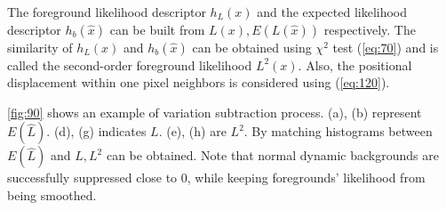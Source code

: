 \documentclass[conference]{IEEEtran}
\begin{document}
The foreground likelihood descriptor \begin{math} h_L(x) \end{math} and the expected likelihood descriptor \begin{math} h_b(\hat{x}) \end{math} can be built from \begin{math} L(x), E(L(\hat{x})) \end{math} respectively. The similarity of \begin{math} h_L(x) \end{math}  and \begin{math} h_b(\hat{x}) \end{math} can be obtained using \begin{math} \chi ^2 \end{math} test (\ref{eq:70}) and is called the second-order foreground likelihood \begin{math} L^2(x) \end{math}. Also, the positional displacement within one pixel neighbors is considered using (\ref{eq:120}).

\ref{fig:90} shows an example of variation subtraction process. (a), (b) represent \begin{math} E(\hat{L}) \end{math}. (d), (g) indicates \begin{math} L \end{math}. (e), (h) are \begin{math} L^2 \end{math}. By matching histograms between \begin{math} E(\hat{L}) \end{math} and \begin{math} L, L^2 \end{math} can be obtained. Note that normal dynamic backgrounds are successfully suppressed close to 0, while keeping foregrounds' likelihood from being smoothed.
\end{document}
